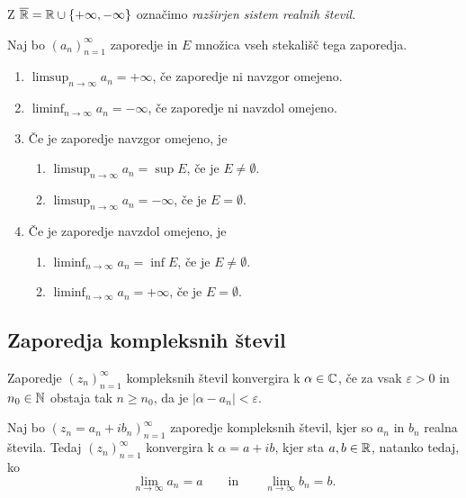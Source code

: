 \documentclass[12pt, a4paper]{article}
\begin{document}
\begin{opomba}
Z $\overline{\mathbb{R}}=\mathbb{R}\cup\left\{+\infty,-\infty\right\}$ označimo \emph{razširjen sistem realnih števil}.
\end{opomba}

\begin{definicija}
Naj bo $(a_n)_{n=1}^\infty$ zaporedje in $E$ množica vseh stekališč tega zaporedja.

\begin{enumerate}[label=\roman*)]
\item $\displaystyle\limsup_{n\to\infty}a_n=+\infty$, če zaporedje ni navzgor omejeno.
\item $\displaystyle\liminf_{n\to\infty}a_n=-\infty$, če zaporedje ni navzdol omejeno.
\item Če je zaporedje navzgor omejeno, je

\begin{enumerate}[label=\roman*)]
\item $\displaystyle\limsup_{n\to\infty}a_n=\sup E$, če je $E\ne\emptyset$.
\item $\displaystyle\limsup_{n\to\infty}a_n=-\infty$, če je $E=\emptyset$.
\end{enumerate}

\item Če je zaporedje navzdol omejeno, je

\begin{enumerate}[label=\roman*)]
\item $\displaystyle\liminf_{n\to\infty}a_n=\inf E$, če je $E\ne\emptyset$.
\item $\displaystyle\liminf_{n\to\infty}a_n=+\infty$, če je $E=\emptyset$.
\end{enumerate}
\end{enumerate}
\end{definicija}

\newpage

\subsection{Zaporedja kompleksnih števil}

\begin{definicija}
Zaporedje $(z_n)_{n=1}^\infty$ kompleksnih števil konvergira k $\alpha\in\mathbb{C}$, če za vsak $\varepsilon>0$ in $n_0\in\mathbb{N}$ obstaja tak $n\geq n_0$, da je $|\alpha-a_n|<\varepsilon$.
\end{definicija}

\begin{izrek}
Naj bo $(z_n=a_n+ib_n)_{n=1}^\infty$ zaporedje kompleksnih števil, kjer so $a_n$ in $b_n$ realna števila. Tedaj $(z_n)_{n=1}^\infty$ konvergira k $\alpha=a+ib$, kjer sta $a,b\in\mathbb{R}$, natanko tedaj, ko
\[
\lim_{n\to\infty}a_n=a\qquad\text{in}\qquad\lim_{n\to\infty}b_n=b.
\]
\end{izrek}
\end{document}
